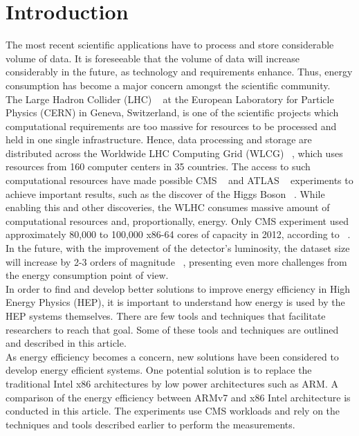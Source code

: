 \documentclass[a4paper]{jpconf}
\begin{document}
\section{Introduction}

 The most recent scientific applications have to process and store considerable 
volume of data. It is foreseeable that the volume of data will increase 
considerably in the future, as technology and requirements enhance. Thus, energy 
consumption has become a major concern amongst the scientific community. \\
 The Large Hadron Collider (LHC) ~\cite{LHCPAPER} at the European Laboratory for 
Particle Physics (CERN) in Geneva, Switzerland, is one of the scientific
projects which computational requirements are too massive for resources to be
 processed and held in one single infrastructure. Hence, data processing and 
storage 
are distributed across the Worldwide LHC Computing Grid (WLCG) ~\cite{WLHC}, 
which uses resources from 160 computer centers in 35 countries. The access to 
such computational resources have made possible CMS ~\cite{CMSDET} and ATLAS
 ~\cite{ATLAS} experiments to achieve important results, such as the discover of 
the Higgs Boson ~\cite{CMSHIGGS, ATLASHIGGS}. While enabling this and other
discoveries, the WLHC consumes massive amount of computational resources and, 
proportionally, energy. Only CMS experiment used approximately 80,000 to 100,000 
x86-64 cores of capacity in 2012, according to ~\cite{ACAT13ARM, CHEP13ARMPHI}.
In the future, with the improvement of the detector's luminosity, the dataset size
will increase by 2-3 orders of magnitude ~\cite{ACAT13ARM, CHEP13ARMPHI},
presenting even more challenges from the energy consumption point of view. \\

 In order to find and develop better solutions to improve energy efficiency in
High Energy Physics (HEP), it is
 important to understand how energy is used by the HEP systems themselves. There 
are 
few tools and techniques that facilitate researchers to reach that goal. Some of
these tools and techniques are outlined and described in this article.  \\
 As energy efficiency becomes a concern, new
solutions have been considered to develop energy efficient systems. One potential
solution is to replace the traditional Intel x86 architectures by low power
architectures such as ARM. A comparison of the energy efficiency between ARMv7 and 
x86 Intel architecture is conducted in this article. The experiments use CMS 
workloads and rely on the techniques and tools described earlier to perform the
measurements.\\
\end{document}
